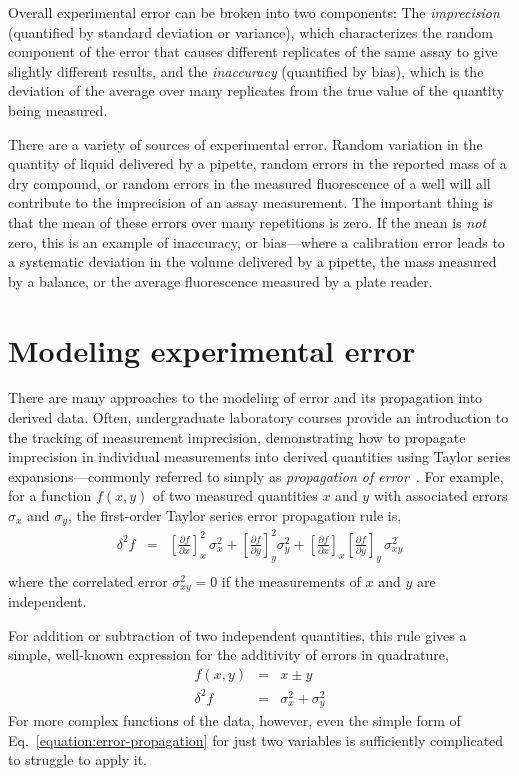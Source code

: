 \documentclass[aps,pre,twocolumn,nofootinbib,superscriptaddress,linenumbers]{revtex4-1}
\begin{document}
Overall experimental error can be broken into two components: The \emph{imprecision} (quantified by standard deviation or variance), which characterizes the random component of the error that causes different replicates of the same assay to give slightly different results, and the \emph{inaccuracy} (quantified by bias), which is the deviation of the average over many replicates from the true value of the quantity being measured.

There are a variety of sources of experimental error. 
Random variation in the quantity of liquid delivered by a pipette, random errors in the reported mass of a dry compound, or random errors in the measured fluorescence of a well will all contribute to the imprecision of an assay measurement.
The important thing is that the mean of these errors over many repetitions is zero. 
If the mean is \emph{not} zero, this is an example of inaccuracy, or bias---where a calibration error leads to a systematic deviation in the volume delivered by a pipette, the mass measured by a balance, or the average fluorescence measured by a plate reader.

\section*{Modeling experimental error}

There are many approaches to the modeling of error and its propagation into derived data.
Often, undergraduate laboratory courses provide an introduction to the tracking of measurement imprecision, demonstrating how to propagate imprecision in individual measurements into derived quantities using Taylor series expansions---commonly referred to simply as \emph{propagation of error}~\cite{taylor_introduction_1997}.
For example, for a function $f(x,y)$ of two measured quantities $x$ and $y$ with associated errors $\sigma_x$ and $\sigma_y$, the first-order Taylor series error propagation rule is,
\begin{eqnarray}
\delta^2 f &=& \left[\frac{\partial f}{\partial x}\right]^2_x \, \sigma^2_x + \left[\frac{\partial f}{\partial y}\right]^2_y \sigma^2_y + \left[\frac{\partial f}{\partial x}\right]_x \left[\frac{\partial f}{\partial y}\right]_y \, \sigma^2_{xy} \nonumber \\ \label{equation:error-propagation}
\end{eqnarray}
where the correlated error $\sigma^2_{xy} = 0$ if the measurements of $x$ and $y$ are independent.

For addition or subtraction of two independent quantities, this rule gives a simple, well-known expression for the additivity of errors in quadrature,
\begin{eqnarray}
f(x,y) &=& x \pm y \nonumber \\
\delta^2 f &=& \sigma^2_x + \sigma^2_y 
\end{eqnarray}
For more complex functions of the data, however, even the simple form of Eq.~\ref{equation:error-propagation} for just two variables is sufficiently complicated to struggle to apply it.
\end{document}
